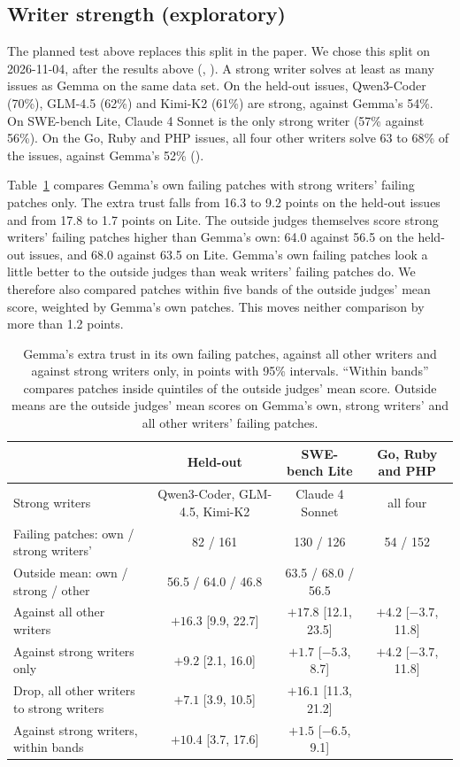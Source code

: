 \documentclass[10pt,letterpaper]{article}
\begin{document}
\subsection*{Writer strength (exploratory)}

The planned test above replaces this split in the paper. We chose this split on 2026-11-04, after the results above (,
). A strong writer solves at least as many issues as Gemma on the
same data set. On the held-out issues, Qwen3-Coder (70\%), GLM-4.5 (62\%) and Kimi-K2 (61\%) are strong, against
Gemma's 54\%. On SWE-bench Lite, Claude 4 Sonnet is the only strong writer (57\% against 56\%). On the Go, Ruby and
PHP issues, all four other writers solve 63 to 68\% of the issues, against Gemma's 52\%
().

Table~\ref{tab:strong} compares Gemma's own failing patches with strong writers' failing patches only. The extra trust
falls from 16.3 to 9.2 points on the held-out issues and from 17.8 to 1.7 points on Lite. The outside judges
themselves score strong writers' failing patches higher than Gemma's own: 64.0 against 56.5 on the held-out issues,
and 68.0 against 63.5 on Lite. Gemma's own failing patches look a little better to the outside judges than weak
writers' failing patches do. We therefore also compared patches within five bands of the outside judges' mean score,
weighted by Gemma's own patches. This moves neither comparison by more than 1.2 points.

\begin{table}[H]
\centering
\small
\caption{Gemma's extra trust in its own failing patches, against all other writers and against strong writers only, in
points with 95\% intervals. ``Within bands'' compares patches inside quintiles of the outside judges' mean score.
Outside means are the outside judges' mean scores on Gemma's own, strong writers' and all other writers' failing
patches.}
\label{tab:strong}
\footnotesize
\begin{tabular}{@{}lccc@{}}
\toprule
 & Held-out & SWE-bench Lite & Go, Ruby and PHP \\
\midrule
Strong writers & Qwen3-Coder, GLM-4.5, Kimi-K2 & Claude 4 Sonnet & all four \\[2pt]
Failing patches: own / strong writers' & 82 / 161 & 130 / 126 & 54 / 152 \\
Outside mean: own / strong / other & 56.5 / 64.0 / 46.8 & 63.5 / 68.0 / 56.5 & \\
Against all other writers & $+16.3$ [9.9, 22.7] & $+17.8$ [12.1, 23.5] & $+4.2$ [$-3.7$, 11.8] \\
Against strong writers only & $+9.2$ [2.1, 16.0] & $+1.7$ [$-5.3$, 8.7] & $+4.2$ [$-3.7$, 11.8] \\
Drop, all other writers to strong writers & $+7.1$ [3.9, 10.5] & $+16.1$ [11.3, 21.2] & \\
Against strong writers, within bands & $+10.4$ [3.7, 17.6] & $+1.5$ [$-6.5$, 9.1] & \\
\bottomrule
\end{tabular}
\end{table}
\end{document}
